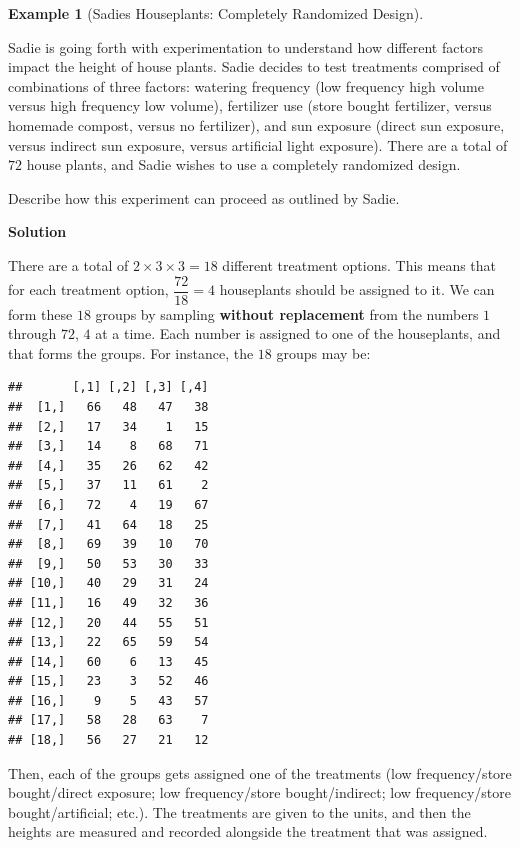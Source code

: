 \documentclass[
  letterpaper,
  DIV=11,
  numbers=noendperiod]{scrreprt}
\theoremstyle{definition}
\theoremstyle{definition}
\newtheorem{example}{Example}[chapter]
\theoremstyle{definition}
\theoremstyle{remark}
\begin{document}
\begin{example}[Sadies Houseplants: Completely Randomized
Design]\protect\hypertarget{exm-completely-randomized-design}{}\label{exm-completely-randomized-design}

Sadie is going forth with experimentation to understand how different
factors impact the height of house plants. Sadie decides to test
treatments comprised of combinations of three factors: watering
frequency (low frequency high volume versus high frequency low volume),
fertilizer use (store bought fertilizer, versus homemade compost, versus
no fertilizer), and sun exposure (direct sun exposure, versus indirect
sun exposure, versus artificial light exposure). There are a total of
\(72\) house plants, and Sadie wishes to use a completely randomized
design.

Describe how this experiment can proceed as outlined by Sadie.

\begin{tcolorbox}[enhanced jigsaw, colback=white, colframe=quarto-callout-color-frame, arc=.35mm, leftrule=.75mm, rightrule=.15mm, opacityback=0, breakable, bottomrule=.15mm, left=2mm, toprule=.15mm]

\vspace{-3mm}\textbf{Solution}\vspace{3mm}

There are a total of \(2\times3\times 3 = 18\) different treatment
options. This means that for each treatment option,
\(\dfrac{72}{18} = 4\) houseplants should be assigned to it. We can form
these \(18\) groups by sampling \textbf{without replacement} from the
numbers \(1\) through \(72\), \(4\) at a time. Each number is assigned
to one of the houseplants, and that forms the groups. For instance, the
\(18\) groups may be:

\begin{verbatim}
##       [,1] [,2] [,3] [,4]
##  [1,]   66   48   47   38
##  [2,]   17   34    1   15
##  [3,]   14    8   68   71
##  [4,]   35   26   62   42
##  [5,]   37   11   61    2
##  [6,]   72    4   19   67
##  [7,]   41   64   18   25
##  [8,]   69   39   10   70
##  [9,]   50   53   30   33
## [10,]   40   29   31   24
## [11,]   16   49   32   36
## [12,]   20   44   55   51
## [13,]   22   65   59   54
## [14,]   60    6   13   45
## [15,]   23    3   52   46
## [16,]    9    5   43   57
## [17,]   58   28   63    7
## [18,]   56   27   21   12
\end{verbatim}

Then, each of the groups gets assigned one of the treatments (low
frequency/store bought/direct exposure; low frequency/store
bought/indirect; low frequency/store bought/artificial; etc.). The
treatments are given to the units, and then the heights are measured and
recorded alongside the treatment that was assigned.

\end{tcolorbox}

\end{example}
\end{document}

